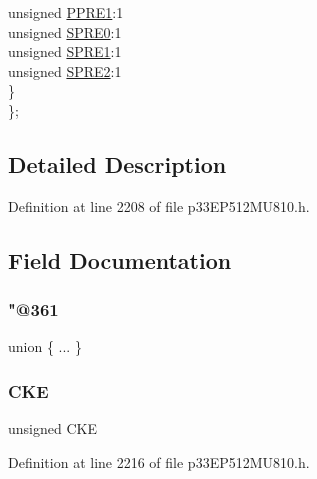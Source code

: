 \begin{DoxyCompactItemize}
\begin{tabbing}
\>\>unsigned \hyperlink{structtag_s_p_i3_c_o_n1_b_i_t_s_aa3b2b2be41d5f1c2cbb3d719899ec64b}{PPRE1}:1\\
\>\>unsigned \hyperlink{structtag_s_p_i3_c_o_n1_b_i_t_s_a36cb065bf6e87533eeb108f0f5383f6c}{SPRE0}:1\\
\>\>unsigned \hyperlink{structtag_s_p_i3_c_o_n1_b_i_t_s_aa10bf0541cfc6de804735f5e3beca089}{SPRE1}:1\\
\>\>unsigned \hyperlink{structtag_s_p_i3_c_o_n1_b_i_t_s_ad98c0587f19b608e8e40e67d2327634c}{SPRE2}:1\\
\>\} \\
\}; \\

\end{tabbing}\end{DoxyCompactItemize}


\subsection{Detailed Description}


Definition at line 2208 of file p33\+E\+P512\+M\+U810.\+h.



\subsection{Field Documentation}
\mbox{\label{structtag_s_p_i3_c_o_n1_b_i_t_s_a9ef6b89b799555eb48449588eedf04e4}} 
\subsubsection{\texorpdfstring{"@361}{@361}}
{\footnotesize\ttfamily union \{ ... \} }

\mbox{\label{structtag_s_p_i3_c_o_n1_b_i_t_s_ad6e30ba11b5574f8a5f548a818b64186}} 
\subsubsection{\texorpdfstring{C\+KE}{CKE}}
{\footnotesize\ttfamily unsigned C\+KE}



Definition at line 2216 of file p33\+E\+P512\+M\+U810.\+h.

